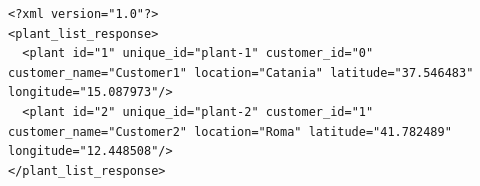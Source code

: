 \begin{lstlisting}[caption={Risposta al servizio \texttt{plant\_list}}, label={code:restful-ws-reply},frame=trBL]
<?xml version="1.0"?>
<plant_list_response>
  <plant id="1" unique_id="plant-1" customer_id="0" customer_name="Customer1" location="Catania" latitude="37.546483" longitude="15.087973"/>
  <plant id="2" unique_id="plant-2" customer_id="1" customer_name="Customer2" location="Roma" latitude="41.782489" longitude="12.448508"/>
</plant_list_response>
\end{lstlisting}



